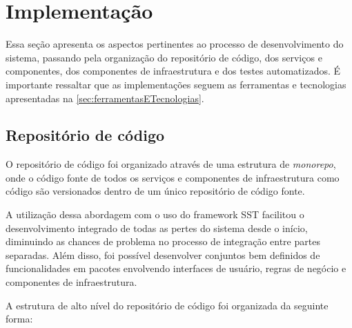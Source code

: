 \section{Implementa\c{c}\~ao}
\label{sec:implementacao}

Essa seção apresenta os aspectos pertinentes ao processo de desenvolvimento do sistema, passando pela organização do repositório de código, dos serviços e componentes, dos componentes de infraestrutura e dos testes automatizados. É importante ressaltar que as implementações seguem as ferramentas e tecnologias apresentadas na \autoref{sec:ferramentasETecnologias}.

\subsection{Repositório de código}
\label{subsec:repositorioDeCodigo}

O repositório de código foi organizado através de uma estrutura de \textit{monorepo}, onde o código fonte de todos os serviços e componentes de infraestrutura como código são versionados dentro de um único repositório de código fonte. 

A utilização dessa abordagem com o uso do framework SST facilitou o desenvolvimento integrado de todas as pertes do sistema desde o início, diminuindo as chances de problema no processo de integração entre partes separadas. Além disso, foi possível desenvolver conjuntos bem definidos de funcionalidades em pacotes envolvendo interfaces de usuário, regras de negócio e componentes de infraestrutura.

A estrutura de alto nível do repositório de código foi organizada da seguinte forma:

